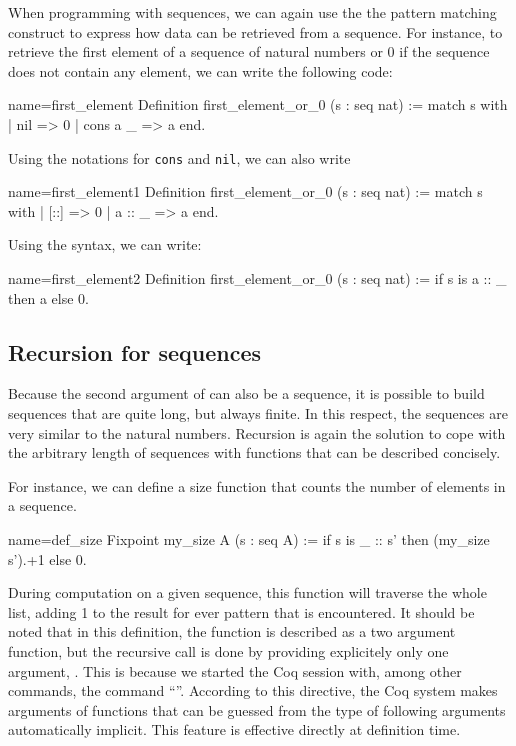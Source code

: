 When programming with sequences, we can again use the the pattern matching
construct to express how data can be retrieved from a sequence.  For
instance, to retrieve the first element of a sequence of natural numbers
or 0 if the sequence does not contain any element, we can write the
following code:

\begin{coq}{name=first_element}{}
Definition first_element_or_0 (s : seq nat) :=
  match s with
  | nil => 0
  | cons a _ => a
  end.
\end{coq}
Using the notations for {\tt cons} and {\tt nil}, we can also write

\begin{coq}{name=first_element1}{}
Definition first_element_or_0 (s : seq nat) :=
  match s with
  | [::] => 0
  | a :: _ => a
  end.
\end{coq}
Using the  syntax, we can write:

\begin{coq}{name=first_element2}{}
Definition first_element_or_0 (s : seq nat) :=
  if s is a :: _ then a else 0.
\end{coq}
\subsection{Recursion for sequences}
Because the second argument of  can also be a sequence, it is
possible to build sequences that are quite long, but always finite.
In this respect, the sequences are very similar to the natural
numbers.  Recursion is again the solution to cope with the arbitrary
length of sequences with functions that can be described concisely.

For instance, we can define a size function that counts the number of
elements in a sequence.

\begin{coq}{name=def_size}{}
Fixpoint my_size A (s : seq A) :=
  if s is _ :: s' then (my_size s').+1 else 0.
\end{coq}
During computation on a given sequence, this function will traverse
the whole list, adding 1 to the result for ever
 pattern that is encountered.  It should be noted that in this
definition, the function  is described as a two argument
function, but the recursive call  is done by providing
explicitely only one argument, .  This is because we started the
Coq session with, among other commands, the command ``''.  According to this directive, the Coq system makes
arguments of functions that can be guessed from the type of following
arguments automatically implicit.  This feature is effective directly
at definition time.

